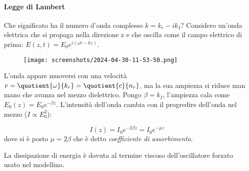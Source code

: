 \paragraph{Legge di Lambert}
Che significato ha il numero d'onda complesso \(k= k_r - i k_I\)? Considero un'onda elettrica che si propaga nella direzione z e che oscilla come il campo elettrico di prima: \(E(z,t) = E_0 e^{i( \omega t - kz)}\).
\begin{figure}[H]
	\centering
	\texttt{[image: screenshots/2024-04-30-11-53-50.png]}
\end{figure}
L'onda appare muoversi con una velocità \(v= \quotient{\omega }{k_r} = \quotient{c}{n_r} \), ma la sua ampiezza si riduce man mano che avanza nel mezzo dielettrico. Pongo \(\beta = k_I\), l'ampiezza cala come \(E_0(z)=E_0 e^{-\beta z}\). L'intensità dell'onda cambia con il progredire dell'onda nel mezzo (\(I \propto E_0 ^{2} \)):
\begin{formula}
	\begin{equation}
		I(z) = I_0 e^{-2 \beta z} = I_0 e^{- \mu z}
	\end{equation}
	dove si è posto \(\mu = 2 \beta \) che è detto \emph{coefficiente di assorbimento}.
\end{formula}
La dissipazione di energia è dovuta al termine viscoso dell'oscillatore forzato usato nel modellino.

